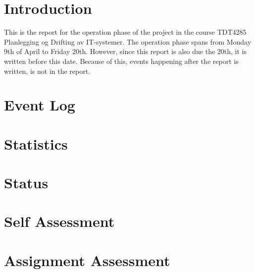 \documentclass[12pt]{article}
\begin{document}

\tableofcontents

\section{Introduction}
This is the report for the operation phase of the project in the course TDT4285 Planlegging og Drifting av IT-systemer. The operation phase spans from Monday 9th of April to Friday 20th. However, since this report is also due the 20th, it is written before this date. Because of this, events happening after the report is written, is not in the report. 



\section{Event Log}



\section{Statistics}



\section{Status}



\section{Self Assessment}



\section{Assignment Assessment}



\end{document}
